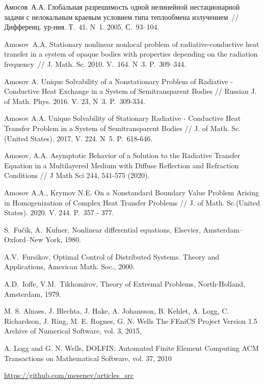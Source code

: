 \documentclass[12pt]{article}
\begin{document}
\begin{thebibliography}{999}
        Амосов~А.А. Глобальная разрешимость одной нелинейной
        нестационарной задачи с нелокальным краевым условием типа
        теплообмена излучением~// Дифференц. ур-ния. Т.~41. N~1.
        2005. С.~93--104.

        Amosov~A.A. Stationary nonlinear nonlocal problem of
        radiative-conductive heat transfer in a system of opaque bodies
        with properties depending on the radiation frequency~// J\@.
        Math. Sc. 2010. V.~164. N~3. P.~309--344.

        Amosov A. Unique Solvability of a Nonstationary Problem of Radiative - Conductive
        Heat Exchange in a System of Semitransparent Bodies // Russian J. of Math.
        Phys. 2016. V. 23, N~3. P.~309-334.

        Amosov A.A. Unique Solvability of Stationary Radiative - Conductive Heat Transfer
        Problem in a System of Semitransparent Bodies // J. of Math. Sc.(United
        States). 2017. V. 224. N~5. P.~618-646.

        Amosov, A.A. Asymptotic Behavior of a Solution to the Radiative Transfer Equation in a Multilayered Medium with Diffuse Reflection and Refraction Conditions // J Math Sci 244, 541-575 (2020).

        Amosov A.A., Krymov N.E. On a Nonstandard Boundary Value Problem Arising in Homogenization of Complex Heat Transfer Problems // J. of Math. Sc.(United
        States). 2020. V. 244. P.~357 - 377.




         S.~Fu\v{c}ik, A.~Kufner, Nonlinear differential equations,
        Elsevier, Amsterdam--Oxford--New York, 1980.

         A.V.~Fursikov, Optimal Control of Distributed
        Systems. Theory and Applications, American Math. Soc., 2000.

         A.D.~Ioffe, V.M.~Tikhomirov, Theory of Extremal
        Problems, North-Holland, Amsterdam, 1979.

         M. S. Alnaes, J. Blechta, J. Hake, A. Johansson,
        B. Kehlet, A. Logg, C. Richardson, J. Ring, M. E. Rognes, G. N. Wells
        The FEniCS Project Version 1.5
        Archive of Numerical Software, vol. 3, 2015,

         A. Logg and G. N. Wells, DOLFIN: Automated Finite Element Computing
        ACM Transactions on Mathematical Software, vol. 37, 2010

         \url{https://github.com/mesenev/articles_src}


    \end{thebibliography}
\end{document}
